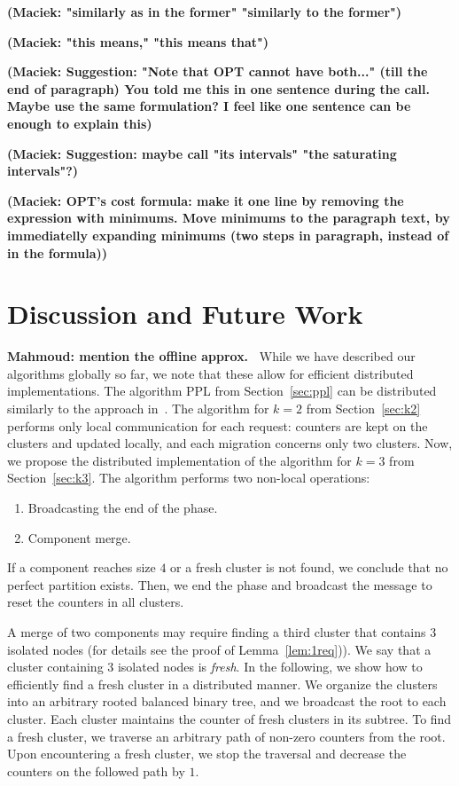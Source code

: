 \documentclass[a4paper,anonymous,USenglish]{lipics-v2019}
\newcommand{\OPT}{\textsf{OPT}\xspace}
\newcommand\mahmoud[1]{\color{orange}\textbf{Mahmoud: #1~}\color{black}}
\newcommand\maciek[1]{\color{brown}\textbf{(Maciek: #1)}\color{black}}
\begin{document}
\maciek{"similarly as in the former" "\textbf{similarly to the former}"}


\maciek{"this means," "\textbf{this means that}"}

\maciek{Suggestion: "Note that \OPT cannot have both..." (till the end of paragraph) You told me this in one sentence during the call. Maybe use the same formulation? I feel like one sentence can be enough to explain this}

\maciek{Suggestion: maybe call "its intervals" "\textbf{the saturating intervals}"?}

\maciek{OPT's cost formula: make it one line by removing the expression with minimums. Move minimums to the paragraph text, by immediatelly expanding minimums (two steps in paragraph, instead of in the formula)}

\section{Discussion and Future Work}

\mahmoud{mention the offline approx.}
While we have described our algorithms globally so far, we note that these allow for efficient distributed implementations. 
The algorithm PPL from Section~\ref{sec:ppl} can be distributed
similarly to the approach in~\cite{sigmetrics19_partitioning}.
The algorithm for $k=2$ from Section~\ref{sec:k2} performs only local communication for each request: counters are kept on the clusters and updated locally, and each migration concerns only two clusters.
\medskip
Now, we propose the distributed implementation of the algorithm for $k=3$ from Section~\ref{sec:k3}.
The algorithm performs two non-local operations:
\begin{enumerate}
	\item Broadcasting the end of the phase.\label{it:broadcast}
	\item Component merge.
	\label{it:merge}
\end{enumerate}

If a component reaches size $4$ or a fresh cluster is not found, we conclude that no perfect partition exists.
Then, we end the phase and broadcast the message to  reset the counters in all clusters.

A merge of two components may require finding a third cluster that contains $3$ isolated nodes (for details see the proof of Lemma~\ref{lem:1req})).
We say that a cluster containing $3$ isolated nodes is \emph{fresh}.
In the following, we show how to efficiently find a fresh cluster in a distributed manner.
We organize the clusters into an arbitrary rooted balanced binary tree, and we broadcast the root to each cluster.
Each cluster maintains the counter of fresh clusters in its subtree.
To find a fresh cluster, we traverse an arbitrary path of non-zero counters from the root.
Upon encountering a fresh cluster, we stop the traversal and decrease the counters on the followed path by $1$.
\end{document}
